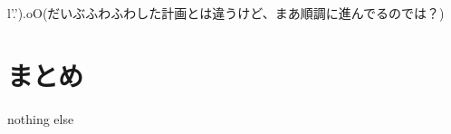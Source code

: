 \documentclass[a4paper, 11pt, titlepage]{jsarticle}
\begin{document}
l'.').oO(だいぶふわふわした計画とは違うけど、まあ順調に進んでるのでは？)



\section{まとめ}
nothing else
\end{document}
